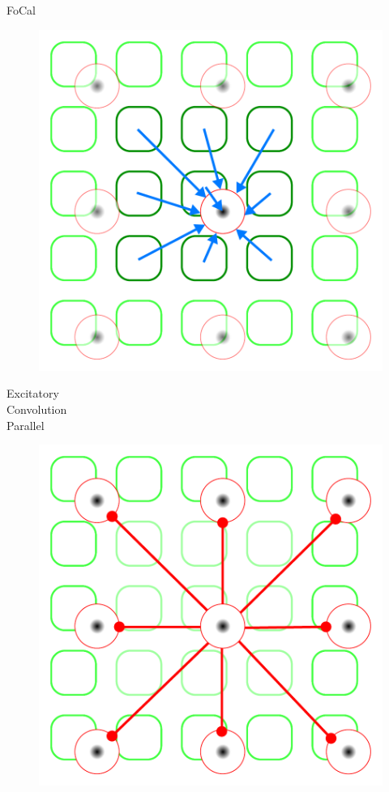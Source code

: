 \documentclass[17pt,mathserif]{beamer}
\begin{document}
    \begin{frame}{FoCal}
      \vspace*{-3em}
      \begin{minipage}{0.48\textwidth}
        \centering
        \begin{figure}
          \includegraphics[scale=0.3]{./single_cell_midget-off}
        \end{figure}
        \vspace*{-1em}
        Excitatory\\
        Convolution\\
        Parallel
      \end{minipage}
      \begin{minipage}{0.48\textwidth}
        \centering
        \begin{figure}
          \includegraphics[scale=0.3]{./single_cell_midget-off-inh}

\end{figure}
\end{minipage}
\end{frame}
\end{document}
